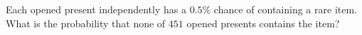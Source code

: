 Each opened present independently has a $0.5\%$ chance of containing a rare item. What is the probability that none of $451$ opened presents contains the item?
